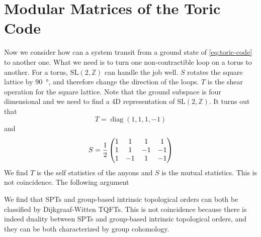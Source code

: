 \documentclass[hyperref, a4paper]{article}
\DeclareMathOperator{\diag}{diag}
\begin{document}
\section{Modular Matrices of the Toric Code}

Now we consider how can a system transit from a ground state of \eqref{eq:toric-code} to another one.
What we need is to turn one non-contractible loop on a torus to another.
For a torus, $\mathrm{SL}(2, \mathbb{Z})$ can handle the job well.
$S$ rotates the square lattice by \SI{90}{\degree}, and therefore change the direction of the loops.
$T$ is the shear operation for the square lattice.
Note that the ground subspace is four dimensional and we need to find a 4D representation of $\mathrm{SL}(2, \mathbb{Z})$.
It turns out that 
\begin{equation}
    T = \diag(1, 1, 1, -1)
\end{equation}
and 
\begin{equation}
    S = \frac{1}{2} \pmqty{1 & 1 & 1 & 1 \\ 1 & 1 & -1 & -1 \\ 1 & -1 & 1 & -1 \\ }
\end{equation}
We find $T$ is the self statistics of the anyons and $S$ is the mutual statistics.
This is not coincidence. The following argument %

We find that SPTs and group-based intrinsic topological orders can both be classified by Dijkgraaf-Witten TQFTs.
This is not coincidence because there is indeed duality between SPTs and group-based intrinsic topological orders, and they can be both characterized by group cohomology.
\end{document}
